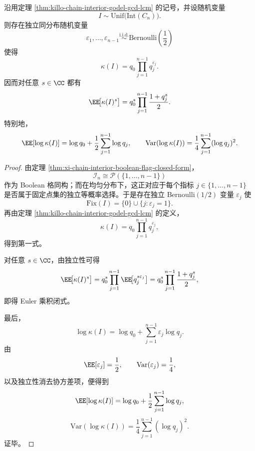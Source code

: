 \begin{theorem}\label{thm:xi-chain-interior-random-godel-euler-logvariance}
沿用定理 \ref{thm:killo-chain-interior-godel-gcd-lcm} 的记号，并设随机变量
\[
I\sim \mathrm{Unif}\bigl(\mathrm{Int}(C_n)\bigr).
\]
则存在独立同分布随机变量
\[
\varepsilon_1,\dots,\varepsilon_{n-1}
\stackrel{\mathrm{i.i.d.}}{\sim}
\mathrm{Bernoulli}\!\left(\frac12\right)
\]
使得
\[
\kappa(I)=q_0\prod_{j=1}^{n-1}q_j^{\varepsilon_j}.
\]
因而对任意 \(s\in\CC\) 都有
\[
\EE\!\bigl[\kappa(I)^s\bigr]
=
q_0^s\prod_{j=1}^{n-1}\frac{1+q_j^s}{2}.
\]
特别地，
\[
\EE[\log \kappa(I)]
=
\log q_0+\frac12\sum_{j=1}^{n-1}\log q_j,
\qquad
\mathrm{Var}(\log \kappa(I))
=
\frac14\sum_{j=1}^{n-1}(\log q_j)^2.
\]
\end{theorem}
\begin{proof}
由定理 \ref{thm:xi-chain-interior-boolean-flag-closed-form}，
\[
\mathcal I_n\cong \mathcal P(\{1,\dots,n-1\})
\]
作为 Boolean 格同构；而在均匀分布下，这正对应于每个指标 \(j\in\{1,\dots,n-1\}\) 是否属于固定点集的独立等概率选择。于是存在独立 Bernoulli\((1/2)\) 变量 \(\varepsilon_j\) 使
\[
\mathrm{Fix}(I)=\{0\}\cup \{j:\varepsilon_j=1\}.
\]
再由定理 \ref{thm:killo-chain-interior-godel-gcd-lcm} 的定义，
\[
\kappa(I)=q_0\prod_{j=1}^{n-1}q_j^{\varepsilon_j},
\]
得到第一式。

对任意 \(s\in\CC\)，由独立性可得
\[
\EE\!\bigl[\kappa(I)^s\bigr]
=
q_0^s\prod_{j=1}^{n-1}\EE\!\bigl[q_j^{s\varepsilon_j}\bigr]
=
q_0^s\prod_{j=1}^{n-1}\frac{1+q_j^s}{2},
\]
即得 Euler 乘积闭式。

最后，
\[
\log\kappa(I)=\log q_0+\sum_{j=1}^{n-1}\varepsilon_j\log q_j.
\]
由
\[
\EE[\varepsilon_j]=\frac12,
\qquad
\mathrm{Var}(\varepsilon_j)=\frac14,
\]
以及独立性消去协方差项，便得到
\[
\EE[\log \kappa(I)]
=
\log q_0+\frac12\sum_{j=1}^{n-1}\log q_j,
\]
\[
\mathrm{Var}(\log \kappa(I))
=
\frac14\sum_{j=1}^{n-1}(\log q_j)^2.
\]
证毕。
\end{proof}
